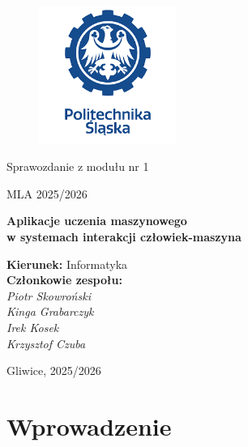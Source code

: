 \documentclass[12pt,a4paper]{article}
\begin{document}
\begin{titlepage}
\centering

\vspace*{2cm}

\begin{figure}[h]
\centering
\includegraphics[width=0.4\textwidth]{media/ps-logo.png}
\end{figure}

\vspace{1.5cm}

{\large Sprawozdanie z modułu nr 1\par}
{\large MLA 2025/2026\par}

\vspace{2cm}

{\Large\textbf{Aplikacje uczenia maszynowego\\w systemach interakcji człowiek-maszyna}\par}

\vspace{3cm}

\begin{flushright}
\textbf{Kierunek:} Informatyka\\[1em]
\textbf{Członkowie zespołu:}\\
\textit{Piotr Skowroński}\\
\textit{Kinga Grabarczyk}\\
\textit{Irek Kosek}\\
\textit{Krzysztof Czuba}
\end{flushright}

\vfill

{\large Gliwice, 2025/2026\par}

\end{titlepage}

\tableofcontents
\newpage

\section{Wprowadzenie}
\end{document}
